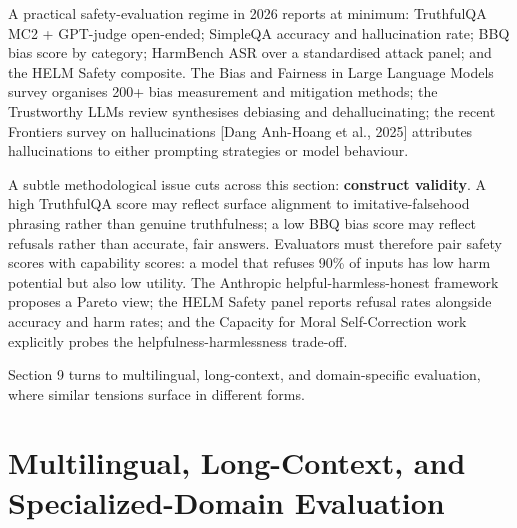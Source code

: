 \documentclass{article}
\begin{document}
A practical safety-evaluation regime in 2026 reports at minimum: TruthfulQA MC2 + GPT-judge open-ended; SimpleQA accuracy and hallucination rate; BBQ bias score by category; HarmBench ASR over a standardised attack panel; and the HELM Safety composite. The Bias and Fairness in Large Language Models survey \cite{gallegos20242024} organises 200+ bias measurement and mitigation methods; the Trustworthy LLMs review \cite{lin20242024} synthesises debiasing and dehallucinating; the recent Frontiers survey on hallucinations {[}Dang Anh-Hoang et al., 2025{]} attributes hallucinations to either prompting strategies or model behaviour.

A subtle methodological issue cuts across this section: \textbf{construct validity}. A high TruthfulQA score may reflect surface alignment to imitative-falsehood phrasing rather than genuine truthfulness; a low BBQ bias score may reflect refusals rather than accurate, fair answers. Evaluators must therefore pair safety scores with capability scores: a model that refuses 90\% of inputs has low harm potential but also low utility. The Anthropic helpful-harmless-honest framework \cite{askell20212021} proposes a Pareto view; the HELM Safety panel reports refusal rates alongside accuracy and harm rates; and the Capacity for Moral Self-Correction work \cite{ganguli20232023} explicitly probes the helpfulness-harmlessness trade-off.

Section 9 turns to multilingual, long-context, and domain-specific evaluation, where similar tensions surface in different forms.

\section{Multilingual, Long-Context, and Specialized-Domain Evaluation}\label{multilingual-long-context-and-specialized-domain-evaluation}
\end{document}
